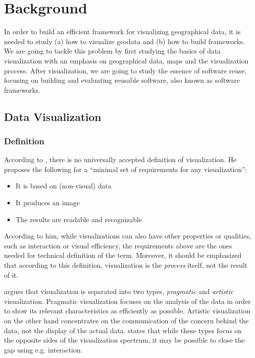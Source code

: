 
\chapter{Background}
\label{chapter:background} 


In order to build an efficient framework for visualizing geographical data, it is needed to study (a) how to visualize geodata and (b) how to build frameworks. We are going to tackle this problem by first studying the basics of data visualization with an emphasis on geographical data, maps and the visualization process. After visualization, we are going to study the essence of software reuse, focusing on building and evaluating reusable software, also known as software frameworks.

\section{Data Visualization}

\subsection{Definition}

According to \citet[chap.~3]{kosara_visualization_2007}, there is no universally accepted definition of visualization. He proposes the following for a ``minimal set of requirements for any visualization'':

\begin{itemize}
	\item It is based on (non-visual) data
	\item It produces an image
	\item The results are readable and recognizable
\end{itemize}

According to him, while visualizations can also have other properties or qualities, such as interaction or visual efficiency, the requirements above are the ones needed for technical definition of the term. Moreover, it should be emphasized that according to this definition, visualization is the \emph{process} itself, not the result of it.

\citet[chap.~4]{kosara_visualization_2007} argues that visualization is separated into two types, \emph{pragmatic} and \emph{artistic} visualization. Pragmatic visualization focuses on the analysis of the data in order to show its relevant characteristics as efficiently as possible. Artistic visualization on the other hand concentrates on the communication of the concern behind the data, not the display of the actual data. \citeauthor{kosara_visualization_2007} states that while these types focus on the opposite sides of the visualization spectrum, it may be possible to close the gap using e.g. interaction.

